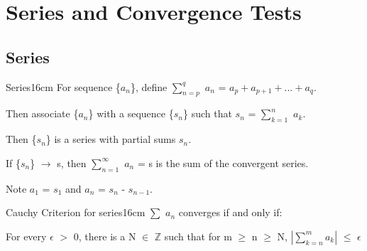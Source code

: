 \newpage

\section[Day 10: Series \& Convergence Tests]{ Series and Convergence Tests }

\subsection{ Series }

    \begin{definition}{Series}{16cm}
        For sequence \{$a_n$\}, define $\sum_{n=p}^q$ $a_n$
        = $a_p + a_{p+1} + ... + a_q$.

        Then associate \{$a_n$\} with a sequence \{$s_n$\}
        such that $s_n$ = $\sum_{k=1}^n$ $a_k$.

        Then \{$s_n$\} is a {\color{lblue} series} with partial sums $s_n$.

        If \{$s_n$\} $\rightarrow$ s, then
        $\sum_{n=1}^{\infty}$ $a_n$ = s
        is the sum of the convergent series.
        
        Note $a_1$ = $s_1$ and $a_n$ = $s_n$ - $s_{n-1}$.
    \end{definition}

    \vspace{0.5cm}



    \begin{wtheorem}{Cauchy Criterion for series}{16cm}
        $\sum$ $a_n$ converges if and only if:
        
        \hspace{0.5cm}
        For every $\epsilon$ $>$ 0, there is a N $\in$ $\mathbb{Z}$
        such that for m $\geq$ n $\geq$ N,
        $| \sum_{k=n}^m a_k |$ $\leq$ $\epsilon$
    \end{wtheorem}

